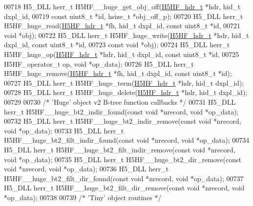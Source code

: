 \begin{DoxyCode}
00718 H5\_DLL herr\_t H5HF\_\_huge\_get\_obj\_off(\hyperlink{struct_h5_h_f__hdr__t}{H5HF\_hdr\_t} *hdr, hid\_t dxpl\_id,
00719     \textcolor{keyword}{const} uint8\_t *\textcolor{keywordtype}{id}, hsize\_t *obj\_off\_p);
00720 H5\_DLL herr\_t H5HF\_huge\_read(\hyperlink{struct_h5_h_f__hdr__t}{H5HF\_hdr\_t} *fh, hid\_t dxpl\_id, \textcolor{keyword}{const} uint8\_t *\textcolor{keywordtype}{id},
00721     \textcolor{keywordtype}{void} *obj);
00722 H5\_DLL herr\_t H5HF\_huge\_write(\hyperlink{struct_h5_h_f__hdr__t}{H5HF\_hdr\_t} *hdr, hid\_t dxpl\_id, \textcolor{keyword}{const} uint8\_t *\textcolor{keywordtype}{id},
00723     \textcolor{keyword}{const} \textcolor{keywordtype}{void} *obj);
00724 H5\_DLL herr\_t H5HF\_huge\_op(\hyperlink{struct_h5_h_f__hdr__t}{H5HF\_hdr\_t} *hdr, hid\_t dxpl\_id, \textcolor{keyword}{const} uint8\_t *\textcolor{keywordtype}{id},
00725     H5HF\_operator\_t op, \textcolor{keywordtype}{void} *op\_data);
00726 H5\_DLL herr\_t H5HF\_huge\_remove(\hyperlink{struct_h5_h_f__hdr__t}{H5HF\_hdr\_t} *fh, hid\_t dxpl\_id, \textcolor{keyword}{const} uint8\_t *\textcolor{keywordtype}{id});
00727 H5\_DLL herr\_t H5HF\_huge\_term(\hyperlink{struct_h5_h_f__hdr__t}{H5HF\_hdr\_t} *hdr, hid\_t dxpl\_id);
00728 H5\_DLL herr\_t H5HF\_huge\_delete(\hyperlink{struct_h5_h_f__hdr__t}{H5HF\_hdr\_t} *hdr, hid\_t dxpl\_id);
00729 
00730 \textcolor{comment}{/* 'Huge' object v2 B-tree function callbacks */}
00731 H5\_DLL herr\_t H5HF\_\_huge\_bt2\_indir\_found(\textcolor{keyword}{const} \textcolor{keywordtype}{void} *nrecord, \textcolor{keywordtype}{void} *op\_data);
00732 H5\_DLL herr\_t H5HF\_\_huge\_bt2\_indir\_remove(\textcolor{keyword}{const} \textcolor{keywordtype}{void} *nrecord, \textcolor{keywordtype}{void} *op\_data);
00733 H5\_DLL herr\_t H5HF\_\_huge\_bt2\_filt\_indir\_found(\textcolor{keyword}{const} \textcolor{keywordtype}{void} *nrecord, \textcolor{keywordtype}{void} *op\_data);
00734 H5\_DLL herr\_t H5HF\_\_huge\_bt2\_filt\_indir\_remove(\textcolor{keyword}{const} \textcolor{keywordtype}{void} *nrecord, \textcolor{keywordtype}{void} *op\_data);
00735 H5\_DLL herr\_t H5HF\_\_huge\_bt2\_dir\_remove(\textcolor{keyword}{const} \textcolor{keywordtype}{void} *nrecord, \textcolor{keywordtype}{void} *op\_data);
00736 H5\_DLL herr\_t H5HF\_\_huge\_bt2\_filt\_dir\_found(\textcolor{keyword}{const} \textcolor{keywordtype}{void} *nrecord, \textcolor{keywordtype}{void} *op\_data);
00737 H5\_DLL herr\_t H5HF\_\_huge\_bt2\_filt\_dir\_remove(\textcolor{keyword}{const} \textcolor{keywordtype}{void} *nrecord, \textcolor{keywordtype}{void} *op\_data);
00738 
00739 \textcolor{comment}{/* 'Tiny' object routines */}

\end{DoxyCode}
